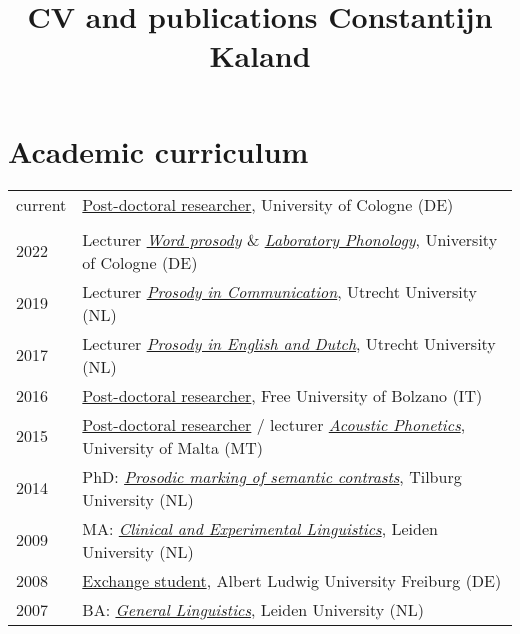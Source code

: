 \documentclass[a4paper,11pt]{article}
\title{CV and publications Constantijn Kaland}
\author{}
\date{}
\begin{document}
\maketitle\vspace{-15mm}

\noindent \section*{Academic curriculum}

\begin{table}[ht!]
\begin{center}
\def\arraystretch{1.5}
\begin{tabular}{p{1.5cm}p{13.5cm}} 
 current & \href{https://sfb1252.uni-koeln.de/en/research-projects/a03-prosodic-prominence-in-cross-linguistic-perspective}{Post-doctoral researcher}, University of Cologne (DE)\\
 & \\
 2022 & Lecturer \href{https://klips2.uni-koeln.de/co/ee/ui/ca2/app/desktop/#/slc.tm.cp/student/courses/372006}{\textit{Word prosody}} \& \href{https://klips2.uni-koeln.de/co/ee/ui/ca2/app/desktop/#/slc.tm.cp/student/courses/409665}{\textit{Laboratory Phonology}}, University of Cologne (DE)\\ 
 2019 & Lecturer \href{https://osiris.uu.nl/osiris_student_uuprd/OnderwijsCatalogusSelect.do?selectie=cursus&collegejaar=2018&cursus=EN3V18008}{\textit{Prosody in Communication}}, Utrecht University (NL)\\
2017 & Lecturer \href{https://www.osiris.universiteitutrecht.nl/osistu_ospr/OnderwijsCatalogusSelect.do?selectie=cursus&collegejaar=2016&cursus=EN3V14102}{\textit{Prosody in English and Dutch}}, Utrecht University (NL)\\
2016 & \href{https://alps.projects.unibz.it/}{Post-doctoral researcher}, Free University of Bolzano (IT)\\
2015 & \href{https://portal.volkswagenstiftung.de/search/projectDetails.do?ref=87117}{Post-doctoral researcher} / lecturer \href{http://www.um.edu.mt/linguistics/studyunit/LIN2099}{\textit{Acoustic Phonetics}}, University of Malta (MT)\\
2014 & PhD: \href{http://www.lotpublications.nl/Documents/366_fulltext.pdf}{\textit{Prosodic marking of semantic contrasts}}, Tilburg University (NL)\\
2009 & MA: \href{https://www.universiteitleiden.nl/en/education/study-programmes/master/linguistics}{\textit{Clinical and Experimental Linguistics}}, Leiden University (NL)\\
2008 & \href{https://ec.europa.eu/programmes/erasmus-plus/opportunities/students_en}{Exchange student}, Albert Ludwig University Freiburg (DE)\\
2007 & BA: \href{https://www.universiteitleiden.nl/en/education/study-programmes/bachelor/linguistics}{\textit{General Linguistics}}, Leiden University (NL)\\
\end{tabular}
\end{center}
\end{table}
\end{document}
